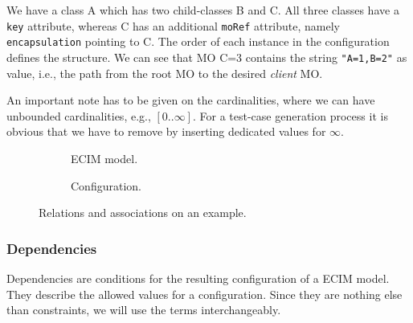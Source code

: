 We have a class \textsf{A} which has two child-classes \textsf{B} and \textsf{C}. All three classes have a \verb|key| attribute, whereas \textsf{C} has an additional \verb|moRef| attribute, namely \verb|encapsulation| pointing to \textsf{C}. The order of each instance in the configuration defines the structure. We can see that MO \textsf{C=3} contains the string \verb|"A=1,B=2"| as value, i.e., the path from the root MO to the desired \emph{client} MO.


An important note has to be given on the cardinalities, where we can have unbounded cardinalities, e.g., $[0..\infty]$. For a test-case generation process it is obvious that we have to remove by inserting dedicated values for $\infty$.

\begin{figure}[hb]
\centering
 \begin{subfigure}[b]{0.5\textwidth}
  \caption{ECIM model.}
 \end{subfigure}
 \begin{subfigure}[b]{0.5\textwidth}
  \caption{Configuration.}
 \end{subfigure}
 \caption{Relations and associations on an example.}
 \label{fig:relEx}
\end{figure}

\subsubsection*{Dependencies}

Dependencies are conditions for the resulting configuration of a ECIM model. They describe the allowed values for a configuration. Since they are nothing else than constraints, we will use the terms interchangeably.

